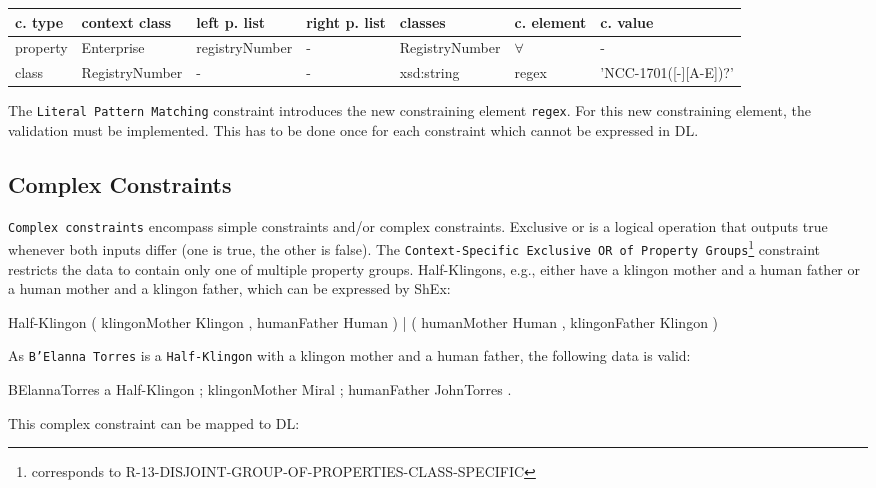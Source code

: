 \documentclass{llncs}
\newcommand{\ms}[1]{\texttt{#1}}
\newenvironment{gcotable}{
  \scriptsize
  \sffamily
  \vspace{0cm}
	\begin{center}
  \begin{tabular}{l|l|l|l|l|l|l}
  \hline
  \textbf{c. type} & \textbf{context class} & \textbf{left p. list} & \textbf{right p. list} & \textbf{classes} & \textbf{c. element} & \textbf{c. value} \\
  \hline

}{
  \hline
  \end{tabular}
	\end{center}
}
\newenvironment{DL}{
  \vspace{0cm}
	\begin{center}
  \begin{tabular}{r l}

}{
  \end{tabular}
	\end{center}
}
\begin{document}
\begin{gcotable}
property & Enterprise & registryNumber & - & RegistryNumber & $\forall$ & - \\
class & RegistryNumber & - & - & xsd:string & regex & 'NCC-1701([-][A-E])?' \\
\end{gcotable}

The \ms{Literal Pattern Matching} constraint introduces the new constraining element \ms{regex}.
For this new constraining element, the validation must be implemented.
This has to be done once for each constraint which cannot be expressed in DL.

\subsection{Complex Constraints}

\ms{Complex constraints} encompass simple constraints and/or complex constraints.
Exclusive or is a logical operation that outputs true whenever both inputs differ (one is true, the other is false).
The \ms{Context-Specific Exclusive OR of Property Groups}\footnote{corresponds to R-13-DISJOINT-GROUP-OF-PROPERTIES-CLASS-SPECIFIC} 
constraint restricts the data to contain only one of multiple property groups.
Half-Klingons, e.g., either have a klingon mother and a human father or a human mother and a klingon father, which can be expressed by ShEx:

\begin{ex}
Half-Klingon { 
    ( klingonMother Klingon , humanFather Human ) |
    ( humanMother Human , klingonFather Klingon ) }
\end{ex}

As \ms{B'Elanna Torres} is a \ms{Half-Klingon} with a klingon mother and a human father, the following data is valid:

\begin{ex}
BElannaTorres a Half-Klingon ;
    klingonMother Miral ; humanFather JohnTorres .
\end{ex}


This complex constraint can be mapped to DL:
\end{document}
